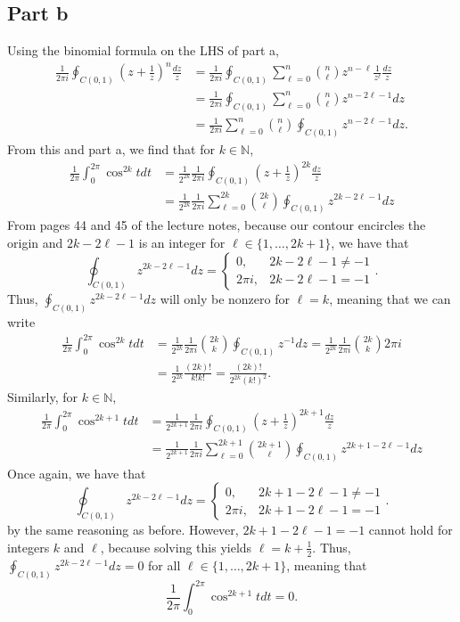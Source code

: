 \documentclass{article}
\begin{document}
\subsection{Part b}
Using the binomial formula on the LHS of part a, 
\begin{align*}
\frac{1}{2\pi i}\oint_{C(0,1)}\left(z+\frac{1}{z}\right)^n\frac{dz}{z}&=\frac{1}{2\pi i}\oint_{C(0,1)}\sum_{\ell=0}^n\binom{n}{\ell}z^{n-\ell}\frac{1}{z^\ell}\frac{dz}{z}\\&=
\frac{1}{2\pi i}\oint_{C(0,1)}\sum_{\ell=0}^n\binom{n}{\ell}z^{n-2\ell-1}dz\\&=
\frac{1}{2\pi i}\sum_{\ell=0}^n\binom{n}{\ell}\oint_{C(0,1)}z^{n-2\ell-1}dz.
\end{align*}
From this and part a, we find that for $k\in\mathbb{N}$, 
\begin{align*}
\frac{1}{2\pi }\int_0^{2\pi}\cos^{2k}t dt&=\frac{1}{2^{2k}}\frac{1}{2\pi i}\oint_{C(0,1)}\left(z+\frac{1}{z}\right)^{2k}\frac{dz}{z}\\&=
\frac{1}{2^{2k}}\frac{1}{2\pi i}\sum_{\ell=0}^{2k}\binom{2k}{\ell}\oint_{C(0,1)}z^{2k-2\ell-1}dz
\end{align*}
From pages 44 and 45 of the lecture notes, because our contour encircles the origin and $2k-2\ell-1$ is an integer for $\ell\in\{1,\ldots, 2k+1\}$, we have that
\[
\oint_{C(0,1)}z^{2k-2\ell-1}dz=
\begin{cases}
0, &2k-2\ell-1\neq-1\\
2\pi i, &2k-2\ell-1=-1
\end{cases}.
\]
Thus, $\oint_{C(0,1)}z^{2k-2\ell-1}dz$ will only be nonzero for $\ell=k$, meaning that we can write 
\begin{align*}
\frac{1}{2\pi }\int_0^{2\pi}\cos^{2k}t dt&=\frac{1}{2^{2k}}\frac{1}{2\pi i}\binom{2k}{k}\oint_{C(0,1)}z^{-1}dz=\frac{1}{2^{2k}}\frac{1}{2\pi i}\binom{2k}{k}2\pi i\\&=
\frac{1}{2^{2k}}\frac{(2k)!}{k! k!}=\frac{(2k)!}{2^{2k}(k!)^2}.
\end{align*}
Similarly, for $k\in\mathbb{N}$, 
\begin{align*}
\frac{1}{2\pi }\int_0^{2\pi}\cos^{2k+1}t dt&=\frac{1}{2^{2k+1}}\frac{1}{2\pi i}\oint_{C(0,1)}\left(z+\frac{1}{z}\right)^{2k+1}\frac{dz}{z}\\&=
\frac{1}{2^{2k+1}}\frac{1}{2\pi i}\sum_{\ell=0}^{2k+1}\binom{2k+1}{\ell}\oint_{C(0,1)}z^{2k+1-2\ell-1}dz
\end{align*}
Once again, we have that 
\[
\oint_{C(0,1)}z^{2k-2\ell-1}dz=
\begin{cases}
0, &2k+1-2\ell-1\neq-1\\
2\pi i, &2k+1-2\ell-1=-1
\end{cases}.
\]
by the same reasoning as before. However, $2k+1-2\ell-1=-1$ cannot hold for integers $k$ and $\ell$, because solving this yields $\ell=k+\frac{1}{2}$. Thus, $\oint_{C(0,1)}z^{2k-2\ell-1}dz=0$ for all $\ell\in\{1,\ldots, 2k+1\}$, meaning that 
\[
\frac{1}{2\pi }\int_0^{2\pi}\cos^{2k+1}t dt=0.
\]
\end{document}
